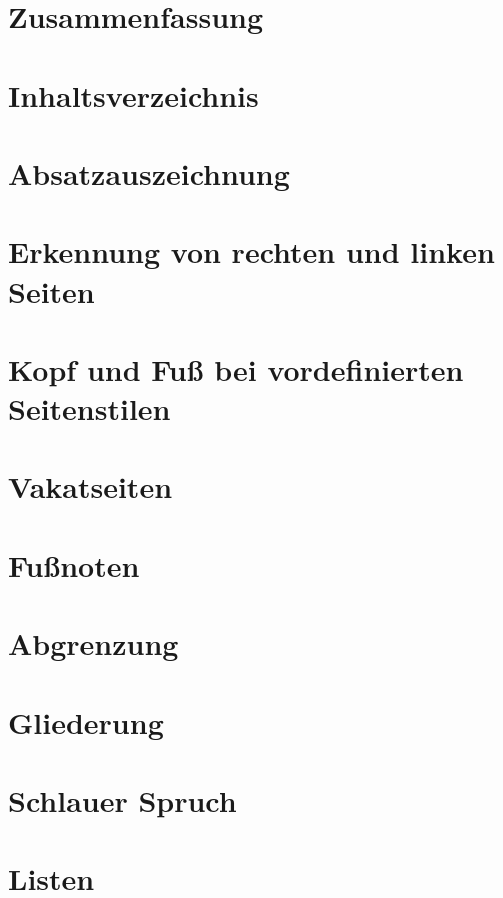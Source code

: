 \section{Zusammenfassung}
\label{sec:Einfuehrung:Hauptklassen:Zusammenfassung}
\lipsum[1-1]
\section{Inhaltsverzeichnis}
\label{sec:Einfuehrung:Hauptklassen:Inhaltsverzeichnis}
\lipsum[1-1]
\section{Absatzauszeichnung}
\label{sec:Einfuehrung:Hauptklassen:Absatzauszeichnung}
\lipsum[1-1]
\section{Erkennung von rechten und linken Seiten}
\label{sec:Einfuehrung:Hauptklassen:Erkennung rechts links}
\lipsum[1-1]
\section{Kopf und Fuß bei vordefinierten Seitenstilen}
\label{sec:Einfuehrung:Hauptklassen:Kopf und Fuss}
\lipsum[1-1]
\section{Vakatseiten}
\label{sec:Einfuehrung:Hauptklassen:Vakatseiten}
\lipsum[1-1]
\section{Fußnoten}
\label{sec:Einfuehrung:Hauptklassen:Fussnoten}
\lipsum[1-1]
\section{Abgrenzung}
\label{sec:Einfuehrung:Hauptklassen:Abgrenzung}
\lipsum[1-1]
\section{Gliederung}
\label{sec:Einfuehrung:Hauptklassen:Gliederung}
\lipsum[1-1]
\section{Schlauer Spruch}
\label{sec:Einfuehrung:Hauptklassen:Schlauer Spruch}
\lipsum[1-1]
\section{Listen}
\label{sec:Einfuehrung:Hauptklassen:Listen}
\lipsum[1-1]
